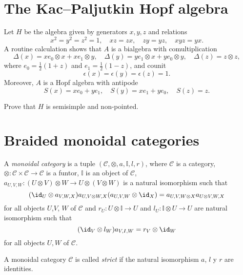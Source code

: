 \documentclass[12pt]{amsproc}
\begin{document}
\section{The Kac--Paljutkin Hopf algebra}

Let $H$ be the algebra given by generators 
$x,y,z$ and relations 
\[
x^2=y^2=z^2=1,\quad 
xz=zx,\quad 
zy=yz,\quad 
xyz=yx.
\]
A routine calculation shows that $A$ is a bialgebra 
with 
comultiplication 
\[
\Delta(x)=xe_0\otimes x+xe_1\otimes y,
\quad 
\Delta(y)=ye_1\otimes x+ye_0\otimes y,
\quad 
\Delta(z)=z\otimes z,
\]
where $e_0=\frac12(1+z)$ and $e_1=\frac12(1-z)$, and 
counit 
\[
\epsilon(x)=\epsilon(y)=\epsilon(z)=1.
\]
Moreover, $A$ is a Hopf algebra 
with antipode 
\[
S(x)=xe_0+ye_1,\quad 
S(y)=xe_1+ye_0,\quad 
S(z)=z.
\]

\begin{exercise}
\label{xca: KacPaljutkin}
    Prove that $H$
    is semisimple and non-pointed. 
\end{exercise}


\section{Braided monoidal categories}
\begin{definition}
A \emph{monoidal category} is a tuple
$(\mathcal{C},\otimes,a,\mathbb{I},l,r)$, where $\mathcal{C}$ is a category,
$\otimes:\mathcal{C}\times\mathcal{C}\to\mathcal{C}$ is a funtor, $\mathbb{I}$
is an object of $\mathcal{C}$, $a_{U,V,W}:(U\otimes V)\otimes W\to
U\otimes(V\otimes W)$ is a natural isomorphism such that 
\begin{equation}
(\id_{U}\otimes a_{V,W,X})a_{U,V\otimes W,X}(a_{U,V,W}\otimes\id_{X})=a_{U,V,W\otimes X}a_{U\otimes V,W,X}\label{eq:pentagon}
\end{equation}
for all objects $U$,$V$, $W$ of $\mathcal{C}$ and $r_{U}:U\otimes\mathbb{I}\to U$
and $l_{U}:\mathbb{I}\otimes U\to U$ are natural isomorphism such
that 
\begin{equation}
(\id_{V}\otimes l_{W})a_{V,I,W}=r_{V}\otimes\id_{W}\label{eq:triangles}
\end{equation}
for all objects $U,W$ of $\mathcal{C}$.
\end{definition}

\begin{definition}
A monoidal category $\mathcal{C}$ is called \emph{strict} if the natural
isomorphism $a$, $l$ y $r$ are identities. 
\end{definition}
\end{document}

